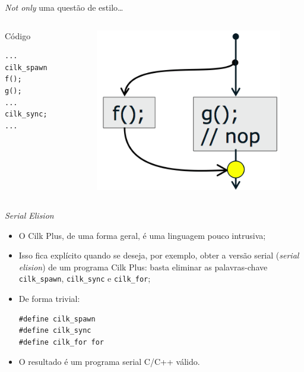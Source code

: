 \documentclass{beamer}
\begin{document}
\begin{frame}[fragile]{\emph{Not only} uma questão de estilo\ldots}
\begin{columns}[c]

\begin{column}{0.3\textwidth}
\begin{block}{Código}
\begin{lstlisting}
...
cilk_spawn f();
g();
...
cilk_sync;
...
\end{lstlisting}
\end{block}
\end{column}

\pause

\begin{column}{0.4\textwidth}
\begin{figure}
\centering
\includegraphics[width=\columnwidth]{./img/good-style.png}
\end{figure}
\end{column}
\end{columns}
\end{frame}

\begin{frame}[fragile]{\textit{Serial Elision}}
\begin{itemize}
    \item O Cilk Plus, de uma forma geral, é uma linguagem pouco intrusiva;
    \item Isso fica explícito quando se deseja, por exemplo, obter a versão
    serial (\textit{serial elision}) de um programa Cilk Plus: basta eliminar as
    palavras-chave \texttt{cilk\_spawn}, \texttt{cilk\_sync} e
    \texttt{cilk\_for};
    \item De forma trivial:
\begin{lstlisting}
#define cilk_spawn
#define cilk_sync
#define cilk_for for
\end{lstlisting}
    \item O resultado é um programa serial C/C++ válido.
\end{itemize}
\end{frame}
\end{document}
